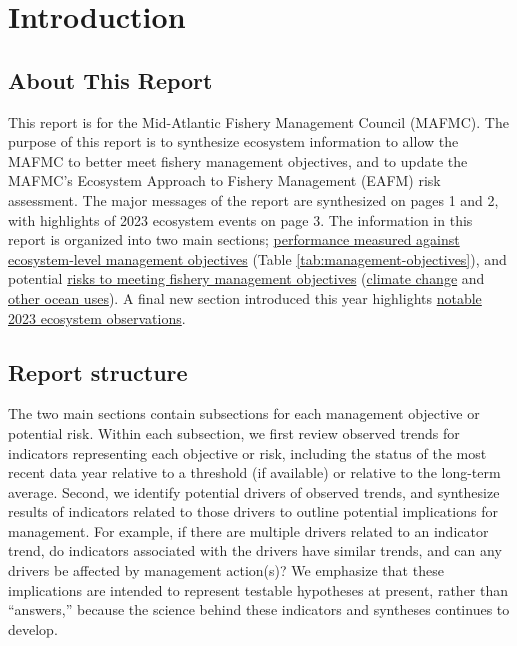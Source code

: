 \documentclass[
  10pt,
]{article}
\author{}
\date{\vspace{-2.5em}}
\begin{document}
\setcounter{page}{4}
\thispagestyle{fancy}

\hypertarget{introduction}{%
\section{Introduction}\label{introduction}}

\hypertarget{about-this-report}{%
\subsection{About This Report}\label{about-this-report}}

This report is for the Mid-Atlantic Fishery Management Council (MAFMC). The purpose of this report is to synthesize ecosystem information to allow the MAFMC to better meet fishery management objectives, and to update the MAFMC's Ecosystem Approach to Fishery Management (EAFM) risk assessment. The major messages of the report are synthesized on pages 1 and 2, with highlights of 2023 ecosystem events on page 3. The information in this report is organized into two main sections; \protect\hyperlink{performance-relative-to-fishery-management-objectives}{performance measured against ecosystem-level management objectives} (Table \ref{tab:management-objectives}), and potential \protect\hyperlink{risks-to-meeting-fishery-management-objectives}{risks to meeting fishery management objectives} (\protect\hyperlink{climate-and-ecosystem-change}{climate change} and \protect\hyperlink{other-ocean-uses-offshore-wind}{other ocean uses}). A final new section introduced this year highlights \protect\hyperlink{highlights}{notable 2023 ecosystem observations}.

\hypertarget{report-structure}{%
\subsection{Report structure}\label{report-structure}}

The two main sections contain subsections for each management objective or potential risk. Within each subsection, we first review observed trends for indicators representing each objective or risk, including the status of the most recent data year relative to a threshold (if available) or relative to the long-term average. Second, we identify potential drivers of observed trends, and synthesize results of indicators related to those drivers to outline potential implications for management. For example, if there are multiple drivers related to an indicator trend, do indicators associated with the drivers have similar trends, and can any drivers be affected by management action(s)? We emphasize that these implications are intended to represent testable hypotheses at present, rather than ``answers,'' because the science behind these indicators and syntheses continues to develop.
\end{document}
